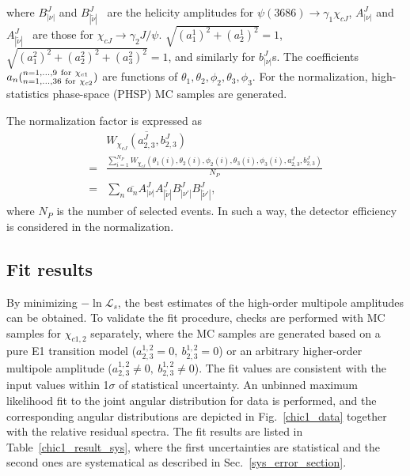 \documentclass[prd,twocolumn,showpacs,amsmath,amssymb]{revtex4-1}
\begin{document}
\noindent where $B_{|\nu|}^{J}$ and $B_{|\widetilde{\nu}|}^{J}$~\cite{amp_012} are the helicity amplitudes for $\psi(3686)\rightarrow\gamma_{1}\chi_{cJ}$, $A_{|\nu|}^{J}$ and $A_{|\widetilde{\nu}|}^{J}$~\cite{amp_012} are those for $\chi_{cJ}\rightarrow\gamma_{2} J/\psi$.
$\sqrt{(a_1^{1})^2+(a_2^{1})^2}=1$, $\sqrt{(a_1^{2})^2+(a_2^{2})^2+(a_3^{2})^2}=1$, and similarly for $b^J_{|\nu|}$s.
The coefficients $a_{n}(^{n=1,\ldots,9 ~{\rm for}~ \chi_{c1}}_{n=1,\ldots,36 ~{\rm for} ~\chi_{c2}})$ are functions of $\theta_{1},\theta_{2},\phi_{2},\theta_{3},\phi_{3}$.
For the normalization, high-statistics phase-space ({\sc PHSP}) MC samples are generated.

The normalization factor is expressed as
\begin{equation}\label{normal_func}
  \begin{split}
 &\overline{W_{\chi_{cJ}}(a_{2,3}^{J},b_{2,3}^{J})} \\
= &\frac{\sum_{i=1}^{N_P}W_{\chi_{cJ}}(\theta_{1}(i),\theta_{2}(i),\phi_{2}(i),\theta_{3}(i),\phi_{3}(i),a_{2,3}^{J},b_{2,3}^{J})}{N_P} \\
=& \sum_{n}\overline{a_{n}}A_{|\nu|}^{J}A_{|\widetilde{\nu}|}^{J}B_{|\nu'|}^{J}B_{|\widetilde{\nu}'|}^{J},
\end{split}
\end{equation}
\noindent where $N_{P}$ is the number of selected events. In such a way, the detector efficiency is considered in the normalization.

\subsection{Fit results}

By minimizing $-\ln\mathcal{L}_{s}$, the best estimates of the high-order multipole amplitudes can be obtained.
To validate the fit procedure, checks are performed with MC samples for $\chi_{c1,2}$ separately, where the MC samples are generated based on a pure E1 transition model ($a_{2,3}^{1,2}=0,~b_{2,3}^{1,2}=0$) or an arbitrary higher-order multipole amplitude ($a_{2,3}^{1,2}\neq0,~b_{2,3}^{1,2}\neq0$).
The fit values are consistent with the input values within 1$\sigma$ of statistical uncertainty.
An unbinned maximum likelihood fit to the joint angular distribution for data is performed, and the corresponding angular distributions are depicted
in Fig.~\ref{chic1_data} together with the relative residual spectra. The fit results are listed in Table~\ref{chic1_result_sys}, where the first uncertainties are statistical and the second ones are systematical as described in Sec.~\ref{sys_error_section}.
\end{document}
